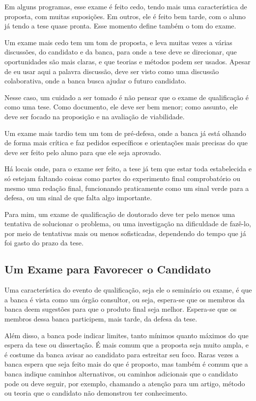 Em alguns programas, esse exame é feito cedo, tendo mais uma característica de proposta, com muitas suposições. Em outros, ele é feito bem tarde, com o aluno já tendo a tese quase pronta. Esse momento define também o tom do exame.

Um exame mais cedo tem um tom de proposta, e leva muitas vezes a várias discussões, do candidato e da banca, para onde a tese deve se direcionar, que oportunidades são mais claras, e que teorias e métodos podem ser usados. Apesar de eu usar aqui a palavra discussão, deve ser visto como uma discussão colaborativa, onde a banca busca ajudar o futuro candidato. 

Nesse caso, um cuidado a ser tomado é não pensar que o exame de qualificação é como uma tese. Como documento, ele deve ser bem menor; como assunto, ele deve ser focado na proposição e na avaliação de viabilidade. 

Um exame mais tardio tem um tom de pré-defesa, onde a banca já está olhando de forma mais crítica e faz pedidos específicos e orientações mais precisas do que deve ser feito pelo aluno para que ele seja aprovado.

Há locais onde, para o exame ser feito, a tese já tem que estar toda estabelecida e só estejam faltando coisas como partes do experimento final comprobatório ou mesmo uma redação final, funcionando praticamente como um sinal verde para a defesa, ou um sinal de que falta algo importante. 

Para mim, um exame de qualificação de doutorado deve ter pelo menos uma tentativa de solucionar o problema, ou uma investigação na dificuldade de fazê-lo, por meio de tentativas mais ou menos sofisticadas, dependendo do tempo que já foi gasto do prazo da tese.

\subsection{Um Exame para Favorecer o Candidato}

Uma característica do evento de qualificação, seja ele o seminário ou exame, é que a banca é vista como um órgão consultor, ou seja, espera-se que os membros da banca deem sugestões para que o produto final seja melhor. Espera-se que os membros dessa banca participem, mais tarde, da defesa da tese.

Além disso, a banca pode indicar limites, tanto mínimos quanto máximos do que espera da tese ou dissertação. É mais comum que a proposta seja muito ampla, e é costume da banca avisar ao candidato para estreitar seu foco. Raras vezes a banca espera que seja feito mais do que é proposto, mas também é comum que a banca indique caminhos alternativos, ou caminhos adicionais que o candidato pode ou deve seguir, por exemplo, chamando a atenção para um artigo, método ou teoria que o candidato não demonstrou ter conhecimento.


